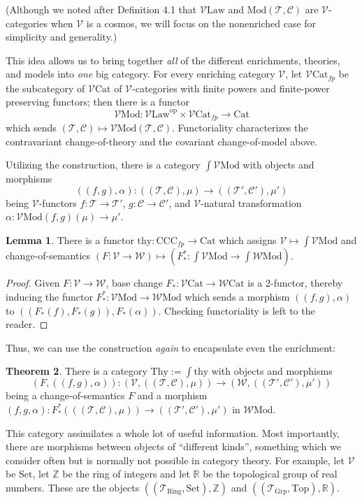 \documentclass[a4paper,UKenglish]{article}
\theoremstyle{definition}
\newtheorem{theorem}{Theorem}
\newtheorem{lemma}[theorem]{Lemma}
\newcommand{\Set}{\mathrm{Set}}
\newcommand{\Grp}{\mathrm{Grp}}
\newcommand{\Cat}{\mathrm{Cat}}
\newcommand{\Law}{\mathrm{Law}}
\newcommand{\Top}{\mathrm{Top}}
\newcommand{\CCC}{\mathrm{CCC}}
\newcommand{\Mod}{\mathrm{Mod}}
\newcommand{\op}{\mathrm{op}}
\newcommand{\V}{\mathscr{V}}
\newcommand{\W}{\mathscr{W}}
\newcommand{\C}{\mathscr{C}}
\newcommand{\T}{\mathscr{T}}
\begin{document}
(Although we noted after Definition 4.1 that $\V\Law$ and $\Mod(\T,\C)$ are $\V$-categories when $\V$ is a cosmos, we will focus on the nonenriched case for simplicity and generality.)

This idea allows us to bring together \textit{all} of the different enrichments, theories, and models into \textit{one} big category. For every enriching category $\V$, let $\V\Cat_{fp}$ be the subcategory of $\V\Cat$ of $\V$-categories with finite powers and finite-power preserving functors; then there is a functor $$\V\Mod: \V\Law^\op \times \V\Cat_{fp} \to \Cat$$ which sends $(\T,\C) \mapsto \V\Mod(\T,\C)$. Functoriality characterizes the contravariant change-of-theory and the covariant change-of-model above.

Utilizing the construction, there is a category \textbf{$\int \V\Mod$} with objects and morphisms $$((f,g),\alpha): ((\T,\C),\mu) \to ((\T',\C'),\mu')$$ being $\V$-functors $f:\T\to \T'$, $g:\C\to \C'$, and $\V$-natural transformation $\alpha:\V\Mod(f,g)(\mu)\to \mu'$.

\begin{lemma}
	There is a functor $\mathrm{thy}: \CCC_{fp} \to \Cat$ which assigns $\V \mapsto \int \V\Mod$ and change-of-semantics $(F: \V \to \W) \mapsto (F_*^*: \int \V\Mod \to \int \W\Mod)$.
\end{lemma}
\begin{proof}
	Given $F:\V\to \W$, base change $F_*: \V\Cat \to \W\Cat$ is a 2-functor, thereby inducing the functor $F_*^*:\V\Mod\to \W\Mod$ which sends a morphism $((f,g),\alpha)$ to $((F_*(f),F_*(g)),F_*(\alpha))$. Checking functoriality is left to the reader.
\end{proof}

Thus, we can use the construction \textit{again} to encapsulate even the enrichment:
\begin{theorem}
	There is a category $\mathrm{Thy} := \int \mathrm{thy}$ with objects and morphisms $$(F,((f,g),\alpha)): (\V,((\T,\C),\mu)) \to (\W,((\T',\C'),\mu'))$$ being a change-of-semantics $F$ and a morphism $(f,g,\alpha): F_*^*(((\T,\C),\mu)) \to ((\T',\C'),\mu')$ in $\W\Mod$.
\end{theorem}

This category assimilates a whole lot of useful information. Most importantly, there are morphisms between objects of ``different kinds'', something which we consider often but is normally not possible in category theory. For example, let $\V$ be $\Set$, let $\mathbb{Z}$ be the ring of integers and let $\mathbb{R}$ be the topological group of real numbers. These are the objects $((\T_{\mathrm{Ring}},\Set),\mathbb{Z})$ and $((\T_\Grp,\Top),\mathbb{R})$.
\end{document}
